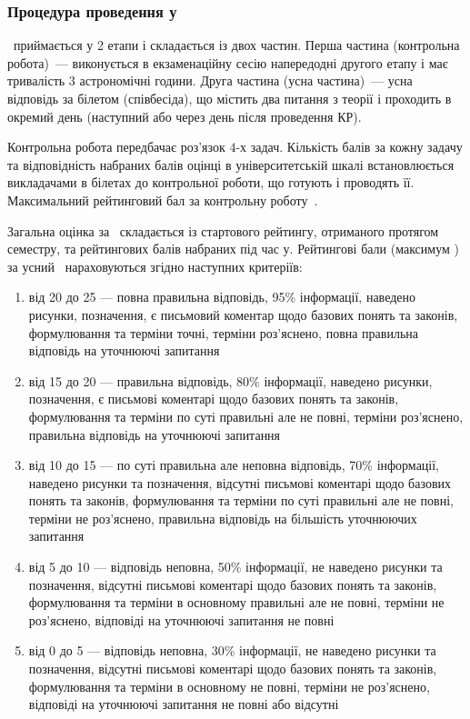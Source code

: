 \documentclass{Syllabus}
\begin{document}
\subsubsection*{Процедура проведення \control у}

\Control\ приймається у 2 етапи і складається із двох частин. Перша частина (контрольна робота)~--- виконується в екзаменаційну сесію напередодні другого етапу і має тривалість $3$ астрономічні години. Друга частина (усна частина)~--- усна відповідь за білетом (співбесіда), що містить два питання з теорії і проходить в окремий день (наступний або через день після проведення КР).

Контрольна робота передбачає роз'язок $4$-х задач. Кількість балів за кожну задачу та відповідність набраних балів оцінці в університетській шкалі встановлюється викладачами в білетах до контрольної роботи, що готують і проводять її. Максимальний рейтинговий бал за контрольну роботу~\kontrolBalp.

Загальна оцінка за \control\ складається із стартового рейтингу, отриманого протягом семестру, та рейтингових балів набраних під час \control у. Рейтингові бали (максимум \kontrolBalu) за усний \control\ нараховуються згідно наступних критеріїв:
\begin{enumerate}[label=$\bullet$]
	\item від 20 до 25 --- повна правильна відповідь, 95\% інформації, наведено рисунки, позначення, є письмовий коментар щодо базових понять та законів, формулювання та терміни точні, терміни роз’яснено, повна правильна відповідь на уточнюючі запитання
	\item від 15 до 20 --- правильна відповідь, 80\% інформації, наведено рисунки, позначення, є письмові коментарі щодо базових понять та законів, формулювання та терміни по суті правильні але не повні, терміни роз’яснено, правильна відповідь на уточнюючі запитання
	\item від 10 до 15 --- по суті правильна але неповна відповідь, 70\% інформації, наведено рисунки та позначення, відсутні письмові коментарі щодо базових понять та законів, формулювання та терміни по суті правильні але не повні, терміни не роз’яснено, правильна відповідь на більшість уточнюючих запитання
	\item від 5 до 10 --- відповідь неповна, 50\% інформації, не наведено рисунки та позначення, відсутні письмові коментарі щодо базових понять та законів, формулювання та терміни в основному правильні але не повні, терміни не роз’яснено, відповіді на уточнюючі запитання не повні
	\item від 0 до 5 --- відповідь неповна, 30\% інформації, не наведено рисунки та позначення, відсутні письмові коментарі щодо базових понять та законів, формулювання та терміни в основному не повні, терміни не роз’яснено, відповіді на уточнюючі запитання не повні або відсутні
\end{enumerate}
\end{document}
